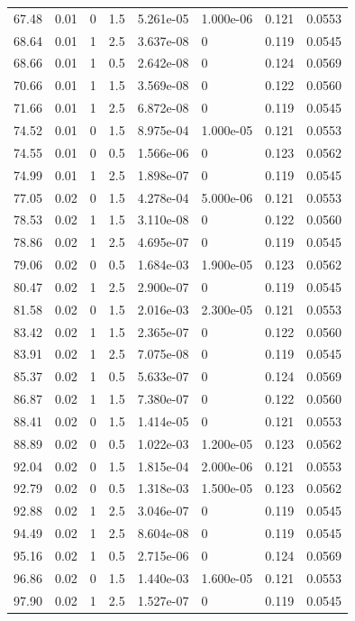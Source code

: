 \documentclass[preview]{standalone}
\begin{document}
{{{\begin{tabular}{L{1.2cm}C{1.2cm} C{0.3cm}C{0.5cm} C{1.4cm}C{1.4cm} C{1.4cm}C{1.4cm}}
  67.48  &  0.01  & 0     & 1.5 &  5.261e-05  & 1.000e-06  & 0.121 &  0.0553   \\ 
  68.64  &  0.01  & 1     & 2.5 &  3.637e-08  & 0  & 0.119 &  0.0545   \\ 
  68.66  &  0.01  & 1     & 0.5 &  2.642e-08  & 0  & 0.124 &  0.0569   \\ 
  70.66  &  0.01  & 1     & 1.5 &  3.569e-08  & 0  & 0.122 &  0.0560   \\ 
  71.66  &  0.01  & 1     & 2.5 &  6.872e-08  & 0  & 0.119 &  0.0545   \\ 
  74.52  &  0.01  & 0     & 1.5 &  8.975e-04  & 1.000e-05  & 0.121 &  0.0553   \\ 
  74.55  &  0.01  & 0     & 0.5 &  1.566e-06  & 0  & 0.123 &  0.0562   \\ 
  74.99  &  0.01  & 1     & 2.5 &  1.898e-07  & 0  & 0.119 &  0.0545   \\ 
  77.05  &  0.02  & 0     & 1.5 &  4.278e-04  & 5.000e-06  & 0.121 &  0.0553   \\ 
  78.53  &  0.02  & 1     & 1.5 &  3.110e-08  & 0  & 0.122 &  0.0560   \\ 
  78.86  &  0.02  & 1     & 2.5 &  4.695e-07  & 0  & 0.119 &  0.0545   \\ 
  79.06  &  0.02  & 0     & 0.5 &  1.684e-03  & 1.900e-05  & 0.123 &  0.0562   \\ 
  80.47  &  0.02  & 1     & 2.5 &  2.900e-07  & 0  & 0.119 &  0.0545   \\ 
  81.58  &  0.02  & 0     & 1.5 &  2.016e-03  & 2.300e-05  & 0.121 &  0.0553   \\ 
  83.42  &  0.02  & 1     & 1.5 &  2.365e-07  & 0  & 0.122 &  0.0560   \\ 
  83.91  &  0.02  & 1     & 2.5 &  7.075e-08  & 0  & 0.119 &  0.0545   \\ 
  85.37  &  0.02  & 1     & 0.5 &  5.633e-07  & 0  & 0.124 &  0.0569   \\ 
  86.87  &  0.02  & 1     & 1.5 &  7.380e-07  & 0  & 0.122 &  0.0560   \\ 
  88.41  &  0.02  & 0     & 1.5 &  1.414e-05  & 0  & 0.121 &  0.0553   \\ 
  88.89  &  0.02  & 0     & 0.5 &  1.022e-03  & 1.200e-05  & 0.123 &  0.0562   \\ 
  92.04  &  0.02  & 0     & 1.5 &  1.815e-04  & 2.000e-06  & 0.121 &  0.0553   \\ 
  92.79  &  0.02  & 0     & 0.5 &  1.318e-03  & 1.500e-05  & 0.123 &  0.0562   \\ 
  92.88  &  0.02  & 1     & 2.5 &  3.046e-07  & 0  & 0.119 &  0.0545   \\ 
  94.49  &  0.02  & 1     & 2.5 &  8.604e-08  & 0  & 0.119 &  0.0545   \\ 
  95.16  &  0.02  & 1     & 0.5 &  2.715e-06  & 0  & 0.124 &  0.0569   \\ 
  96.86  &  0.02  & 0     & 1.5 &  1.440e-03  & 1.600e-05  & 0.121 &  0.0553   \\ 
  97.90  &  0.02  & 1     & 2.5 &  1.527e-07  & 0  & 0.119 &  0.0545   \\ 
\hline 
\end{tabular} 

}}}
\end{document}
